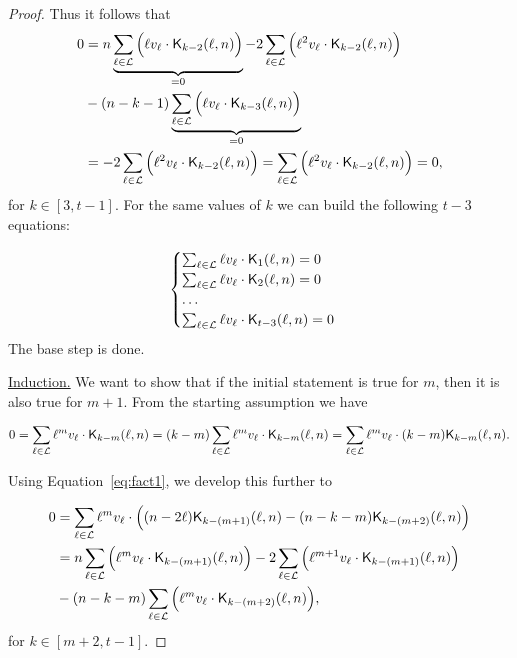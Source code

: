 \begin{proof}
    Thus it follows that
    \begin{equation*}
        \begin{split}
            0 &= n \underbrace{\sum_{\ell \in \mathcal{L}} \Big( \ell v_\ell \cdot \mathsf{K}_{k-2}(\ell,n) \Big)}_{=0} - 2\sum_{\ell \in \mathcal{L}} \Big( \ell^2v_\ell \cdot \mathsf{K}_{k-2}(\ell,n) \Big)\\& - (n - k - 1)\underbrace{\sum_{\ell \in \mathcal{L}} \Big( \ell v_\ell \cdot \mathsf{K}_{k-3}(\ell,n) \Big)}_{=0}\\
            &= -2\sum_{\ell \in \mathcal{L}} \Big( \ell^2v_\ell \cdot \mathsf{K}_{k-2}(\ell,n) \Big) = \sum_{\ell \in \mathcal{L}} \Big( \ell^2v_\ell \cdot \mathsf{K}_{k-2}(\ell,n) \Big) = 0,
        \end{split}
    \end{equation*}
    for $k \in [3, t-1]$. For the same values of $k$ we can build the following $t-3$ equations:

    \begin{equation*}
        \begin{cases}
            \sum_{\ell \in \mathcal{L}} \ell v_\ell \cdot \mathsf{K}_{1}(\ell,n) = 0\\
            \sum_{\ell \in \mathcal{L}} \ell v_\ell \cdot \mathsf{K}_{2}(\ell,n) = 0\\
            \ldots\\
            \sum_{\ell \in \mathcal{L}} \ell v_\ell \cdot \mathsf{K}_{t-3}(\ell,n) = 0\\
        \end{cases}
    \end{equation*}
    The base step is done.

    \underline{Induction.} We want to show that if the initial statement is true for $m$, then it is also true for $m+1$. From the starting assumption we have

    $$
    0 = \sum_{\ell \in \mathcal{L}} \ell^mv_\ell \cdot \mathsf{K}_{k-m}(\ell,n) = (k-m)\sum_{\ell \in \mathcal{L}} \ell^mv_\ell \cdot \mathsf{K}_{k-m}(\ell,n) = \sum_{\ell \in \mathcal{L}} \ell^mv_\ell \cdot (k-m)\mathsf{K}_{k-m}(\ell,n).
    $$

    Using Equation~\ref{eq:fact1}, we develop this further to

    \begin{equation*}
    \begin{split}
        0 &= \sum_{\ell \in \mathcal{L}} \ell^mv_\ell \cdot \Big( (n - 2\ell)\mathsf{K}_{k-(m+1)}(\ell,n) - (n - k - m)\mathsf{K}_{k-(m+2)}(\ell,n) \Big)\\
        & = n \sum_{\ell \in \mathcal{L}} \Big( \ell^mv_\ell \cdot \mathsf{K}_{k-(m+1)}(\ell,n) \Big) - 2\sum_{\ell \in \mathcal{L}} \Big( \ell^{m+1}v_\ell \cdot \mathsf{K}_{k-(m+1)}(\ell,n) \Big)\\& - (n - k - m)\sum_{\ell \in \mathcal{L}} \Big( \ell^mv_\ell \cdot \mathsf{K}_{k-(m+2)}(\ell,n) \Big),
    \end{split}
    \end{equation*}
    for $k \in [m+2, t-1]$.


\end{proof}
